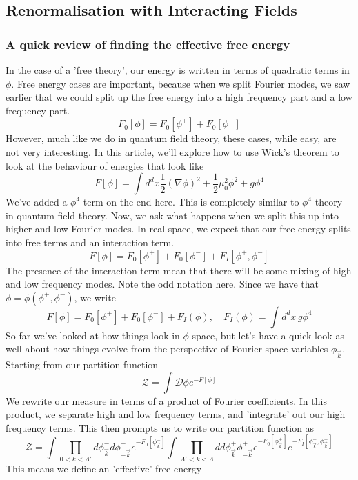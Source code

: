 \subsection{Renormalisation with Interacting Fields} 

\subsubsection{A quick review of finding the effective free energy} 

In the case of a 'free theory',
our energy is written in terms of quadratic terms in 
$ \phi $. Free energy cases are important, because when we split
Fourier modes, we saw earlier that we could split up 
the free energy into a high frequency part and a low frequency part. 
\[
	F_0 [ \phi ] = F_0 \left[  \phi ^ +  \right]  + F_ 0 \left[  \phi ^ -  \right] 
\] However, much like we do in quantum field theory,
these cases, while easy, are not very interesting. In this article, 
we'll explore how to use Wick's theorem to look at the 
behaviour of energies that look like
\[
	F [ \phi ] = \int d^ d x \frac{1}{2 } \left(  \nabla \phi  \right) ^ 2 
	 + \frac{1}{2 } \mu _ 0 ^ 2 \phi ^ 2 + g \phi ^ 4 
\] We've added a $ \phi ^ 4 $ term on the end here. 
This is completely similar to $ \phi ^ 4 $ theory 
in quantum field theory. Now, we ask what happens when we split 
this up into higher and low Fourier modes. In real space, 
we expect that our free energy splits into free terms and 
an interaction term. 
\[
	F [ \phi ] = F_0 [ \phi ^ + ] + F _ 0 [ \phi ^ - ] 
	+ F _ I  [ \phi ^ + , \phi ^ - ] 
\] The presence of the interaction term mean that there
will be some mixing of high and low frequency modes. 
Note the odd notation here. Since we have that 
$ \phi = \phi ( \phi ^ + , \phi ^ - ) $, we write 
 \[
	 F[ \phi ] = F_0 [ \phi ^ + ] + F_0 [ \phi ^ - ] 
	 + F _ I ( \phi ), \quad F _ I ( \phi ) = \int d^ d x \, g \phi ^ 4 
\] So far we've looked at how things look 
in $ \phi $ space, but let's have a quick look as well 
about how things evolve from the perspective of Fourier 
space variables $ \phi_{ \vec{k}}$. Starting 
from our partition function 
\[
	\mathcal{ Z } = \int \mathcal{ D } \phi e ^{ - F [ \phi ] }  
\] We rewrite our measure in terms of a product of Fourier 
coefficients. In this product, we separate high and low frequency 
terms, and 'integrate' out our high frequency terms. This 
then prompts us to write our partition function as 
\[
 \mathcal{ Z } = \int \prod_{ 0 < k < \Lambda ' } d \phi _{ \vec{k} } ^ - d \phi_{ - \vec{k}  } ^ + e ^{ - F_0 [ \phi_{ \vec{k} }^ 
  - ] } \int \prod_{ \Lambda ' < k < \Lambda } dd \phi_{ \vec{k} } ^ + \phi _{ - \vec{k} } ^ + 
  e^{  - F_0 [ \phi _{ \vec{k} } ^ +] } e^{  - F_ I [ \phi _{ \vec{k} } ^ + , \phi _{ \vec{k} } ^ - ]  }
\] This means we define an 'effective' free energy 
